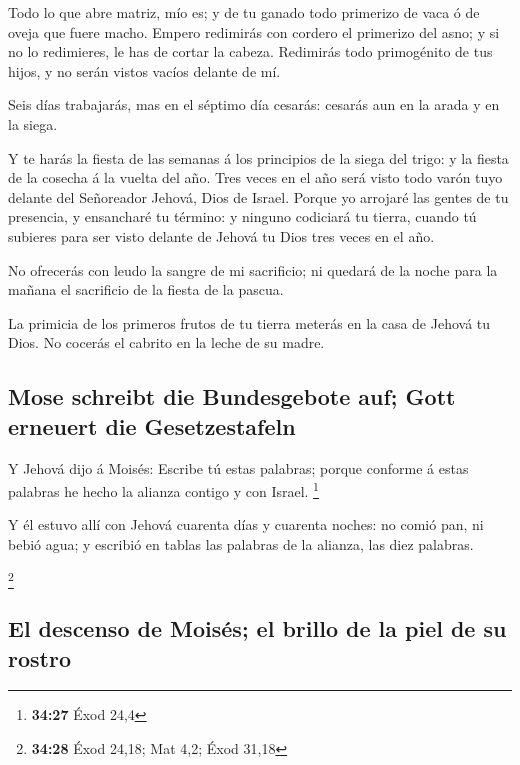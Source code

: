  Todo lo que abre matriz, mío es; y de tu ganado todo
primerizo de vaca ó de oveja que fuere macho.  Empero
redimirás con cordero el primerizo del asno; y si no lo redimieres, le
has de cortar la cabeza. Redimirás todo primogénito de tus hijos, y no
serán vistos vacíos delante de mí.

 Seis días trabajarás, mas en el séptimo día cesarás:
cesarás aun en la arada y en la siega.

 Y te harás la fiesta de las semanas á los principios de la
siega del trigo: y la fiesta de la cosecha á la vuelta del año.
 Tres veces en el año será visto todo varón tuyo delante
del Señoreador Jehová, Dios de Israel.  Porque yo arrojaré
las gentes de tu presencia, y ensancharé tu término: y ninguno codiciará
tu tierra, cuando tú subieres para ser visto delante de Jehová tu Dios
tres veces en el año.

 No ofrecerás con leudo la sangre de mi sacrificio; ni
quedará de la noche para la mañana el sacrificio de la fiesta de la
pascua.

 La primicia de los primeros frutos de tu tierra meterás en
la casa de Jehová tu Dios. No cocerás el cabrito en la leche de su
madre.

\hypertarget{mose-schreibt-die-bundesgebote-auf-gott-erneuert-die-gesetzestafeln}{%
\subsection{Mose schreibt die Bundesgebote auf; Gott erneuert die
Gesetzestafeln}\label{mose-schreibt-die-bundesgebote-auf-gott-erneuert-die-gesetzestafeln}}

 Y Jehová dijo á Moisés: Escribe tú estas palabras; porque
conforme á estas palabras he hecho la alianza contigo y con Israel.
\footnote{\textbf{34:27} Éxod 24,4}

 Y él estuvo allí con Jehová cuarenta días y cuarenta
noches: no comió pan, ni bebió agua; y escribió en tablas las palabras
de la alianza, las diez palabras.

\footnote{\textbf{34:28} Éxod 24,18; Mat 4,2; Éxod 31,18}

\hypertarget{el-descenso-de-moisuxe9s-el-brillo-de-la-piel-de-su-rostro}{%
\subsection{El descenso de Moisés; el brillo de la piel de su
rostro}\label{el-descenso-de-moisuxe9s-el-brillo-de-la-piel-de-su-rostro}}

